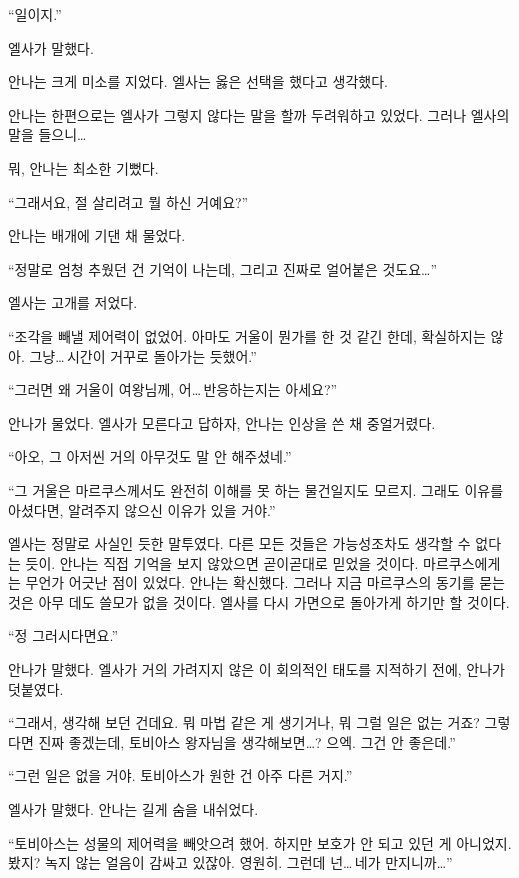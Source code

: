 `` 일이지.''

엘사가 말했다.

안나는 크게 미소를 지었다. 엘사는 옳은 선택을 했다고 생각했다.

\textbreak

안나는 한편으로는 엘사가 그렇지 않다는 말을 할까 두려워하고 있었다. 그러나 엘사의 말을 들으니\ldots

뭐, 안나는 최소한 기뻤다.

``그래서요, 절 살리려고 뭘 하신 거예요?''

안나는 배개에 기댄 채 물었다.

``정말로 엄청 추웠던 건 기억이 나는데, 그리고 진짜로 얼어붙은 것도요\ldots''

엘사는 고개를 저었다.

``조각을 빼낼 제어력이 없었어. 아마도 거울이 뭔가를 한 것 같긴 한데, 확실하지는 않아. 그냥\ldots\,시간이 거꾸로 돌아가는 듯했어.''

``그러면 왜 거울이 여왕님께, 어\ldots\,반응하는지는 아세요?''

안나가 물었다. 엘사가 모른다고 답하자, 안나는 인상을 쓴 채 중얼거렸다.

``아오, 그 아저씬 거의 아무것도 말 안 해주셨네.''

``그 거울은 마르쿠스께서도 완전히 이해를 못 하는 물건일지도 모르지. 그래도 이유를 아셨다면, 알려주지 않으신 이유가 있을 거야.''

엘사는 정말로 사실인 듯한 말투였다. 다른 모든 것들은 가능성조차도 생각할 수 없다는 듯이. 안나는 직접 기억을 보지 않았으면 곧이곧대로 믿었을 것이다. 마르쿠스에게는 무언가 어긋난 점이 있었다. 안나는 확신했다. 그러나 지금 마르쿠스의 동기를 묻는 것은 아무 데도 쓸모가 없을 것이다. 엘사를 다시 가면으로 돌아가게 하기만 할 것이다.

``정 그러시다면요.''

안나가 말했다. 엘사가 거의 가려지지 않은 이 회의적인 태도를 지적하기 전에, 안나가 덧붙였다.

``그래서, 생각해 보던 건데요. 뭐 마법 같은 게 생기거나, 뭐 그럴 일은 없는 거죠? 그렇다면 진짜 좋겠는데, 토비아스 왕자님을 생각해보면\ldots? 으엑. 그건 안 좋은데.''

``그런 일은 없을 거야. 토비아스가 원한 건 아주 다른 거지.''

엘사가 말했다. 안나는 길게 숨을 내쉬었다.

``토비아스는 성물의 제어력을 빼앗으려 했어. 하지만 보호가 안 되고 있던 게 아니었지. 봤지? 녹지 않는 얼음이 감싸고 있잖아. 영원히. 그런데 넌\ldots\,네가 만지니까\ldots''

